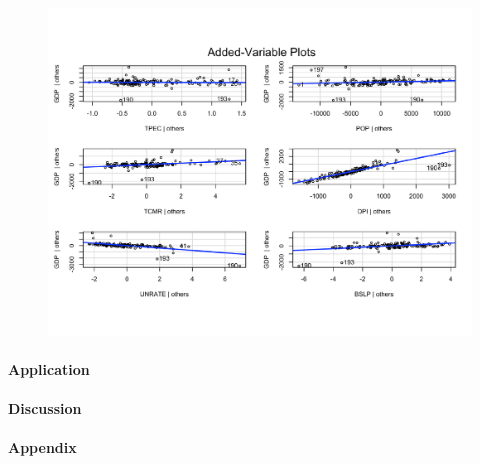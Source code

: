 \documentclass[12pt]{article}
\begin{document}
\begin{figure}[tbp]
  \centering
  \includegraphics[width=\textwidth]{AVP1}
\end{figure}


\paragraph{Application}




\paragraph{Discussion}


\paragraph{Appendix}




\end{document}
